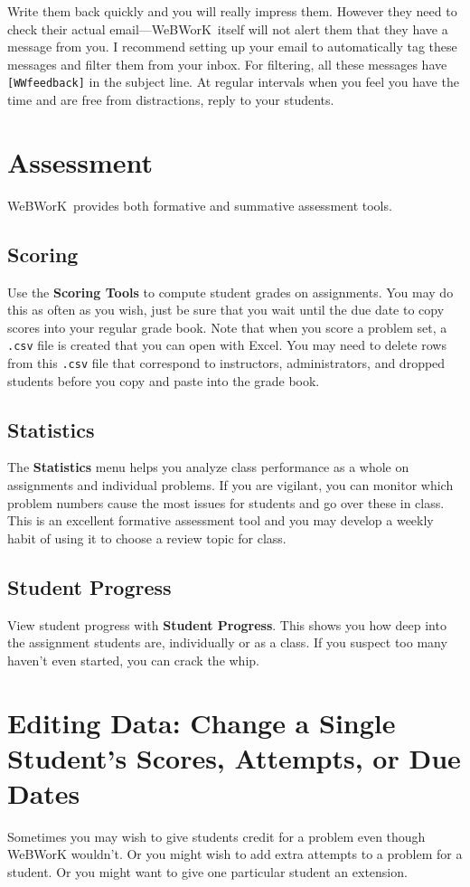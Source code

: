 \documentclass[12pt]{article}
\newcommand{\menu}[1]{\textbf{#1}}
\newcommand{\WW}{WeBWorK}
\begin{document}
Write them back quickly and you will really impress them.  However they need to check their actual email---\WW\ itself will not alert them that they have a message from you. I recommend setting up your email to automatically tag these messages and filter them from your inbox. For filtering, all these messages have \texttt{[WWfeedback]} in the subject line. At regular intervals when you feel you have the time and are free from distractions, reply to your students.

\section{Assessment}
\WW\ provides both formative and summative assessment tools.
\subsection{Scoring}
Use the \menu{Scoring Tools} to compute student grades on assignments.  You may do this as often as you wish, just be sure that you wait until the due date to copy scores into your regular grade book.  Note that when you score a problem set, a \texttt{.csv} file is created that you can open with Excel. You may need to delete rows from this \texttt{.csv} file that correspond to instructors, administrators, and dropped students before you copy and paste into the grade book.

\subsection{Statistics}
The \menu{Statistics} menu helps you analyze class performance as a whole on assignments and individual problems.  If you are vigilant, you can monitor which problem numbers cause the most issues for students and go over these in class. This is an excellent formative assessment tool and you may develop a weekly habit of using it to choose a review topic for class.

\subsection{Student Progress}
View student progress with \menu{Student Progress}.  This shows you how deep into the assignment students are, individually or as a class.  If you suspect too many haven't even started, you can crack the whip.


\section{Editing Data: Change a Single Student's Scores, Attempts, or Due Dates}
Sometimes you may wish to give students credit for a problem even though WeBWorK wouldn't.  Or you might wish to add extra attempts to a problem for a student.  Or you might want to give one particular student an extension.
\end{document}
